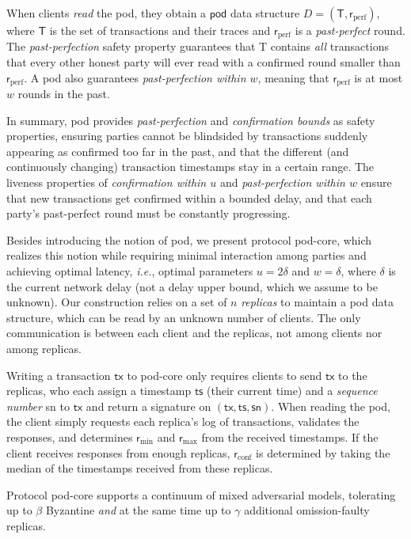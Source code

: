 \documentclass[pdflatex,sn-mathphys-num]{sn-jnl}%
\theoremstyle{thmstyleone}%
\theoremstyle{thmstyletwo}%
\theoremstyle{thmstylethree}%
\newcommand{\podtm}{\textsf{pod}\xspace}
\newcommand{\operand}[1]{\textsf{#1}}
\newcommand{\tx}{\operand{tx}\xspace}
\newcommand{\round}{\operand{r}\xspace}
\newcommand{\rconf}{\ensuremath{\round_\text{conf}}\xspace}
\newcommand{\rmin}{\ensuremath{\round_\text{min}}\xspace}
\newcommand{\rmax}{\ensuremath{\round_\text{max}}\xspace}
\newcommand{\rperf}{\ensuremath{\round_\text{perf}}\xspace}
\newcommand{\tsp}{\operand{ts}\xspace}
\newcommand{\txSet}{\operand{T}\xspace}
\newcommand{\Pod}{\ensuremath{D}\xspace}
\let\oldbeta\beta
\renewcommand{\beta}{\ensuremath{\oldbeta}\xspace}
\let\oldgamma\gamma
\renewcommand{\gamma}{\ensuremath{\oldgamma}\xspace}
\newcommand{\sn}{\operand{sn}\xspace}
\begin{document}
When clients \emph{read} the \podtm, they obtain a $\podtm$ data structure $\Pod = (\txSet, \rperf)$, where $\txSet$ is the set of transactions and their traces and $\rperf$ is a \emph{past-perfect} round. The \emph{past-perfection} safety property guarantees that
\txSet contains \emph{all} transactions that every other honest party will ever read with a confirmed round smaller than $\rperf$.  A \podtm also guarantees \emph{past-perfection within $w$}, meaning that $\rperf$ is at most $w$ rounds in the past.

In summary, \podtm provides \emph{past-perfection} and \emph{confirmation bounds} as safety properties, ensuring parties cannot be blindsided by transactions suddenly appearing as confirmed too far in the past, and that the different (and continuously changing) transaction timestamps stay in a certain range. The liveness properties of \emph{confirmation within $u$} and \emph{past-perfection within $w$} ensure that new transactions get confirmed within a bounded delay, and that each party's past-perfect round must be constantly progressing.

Besides introducing the notion of \podtm, we present protocol \podtm-core, which realizes this notion while requiring minimal interaction among parties and achieving optimal latency, \textit{i.e.}, optimal parameters $u=2\delta$ and $w=\delta$, where $\delta$ is the current network delay (not a delay upper bound, which we assume to be unknown). Our construction relies on a set of $n$ \emph{replicas} to maintain a \podtm data structure, which can be read by an unknown number of clients. The only communication is between each client and the replicas, not among clients nor among replicas.

Writing a transaction $\tx$ to \podtm-core only requires clients to send $\tx$ to the replicas, who each assign a timestamp $\tsp$ (their current time) and a \emph{sequence number} \sn to $\tx$ and return a signature on $(\tx,\tsp, \sn)$. When reading the \podtm, the client simply requests each replica's log of transactions, validates the responses, and determines $\rmin$ and $\rmax$ from the received timestamps. If the client receives responses from enough replicas, $\rconf$ is determined by taking the median of the timestamps received from these replicas.

Protocol \podtm-core supports a continuum of mixed adversarial models, tolerating up to \beta Byzantine \emph{and} at the same time up to \gamma additional omission-faulty replicas.
\end{document}
